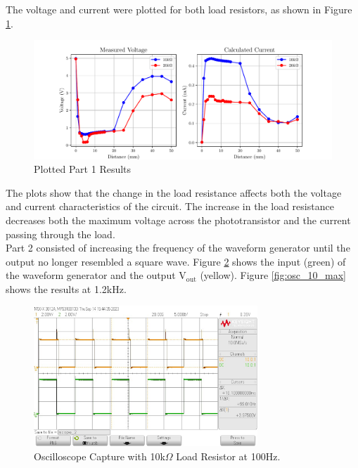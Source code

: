 \documentclass[CMPE]{KGCOEReport}
\begin{document}
The voltage and current were plotted for both load resistors, as shown in Figure \ref{fig:plots}.

\begin{figure}[H]
    \centering
    \includegraphics[width=1\textwidth]{results_plot.pdf}
    \caption{Plotted Part 1 Results}
    \label{fig:plots}
\end{figure}

The plots show that the change in the load resistance affects both the voltage and current characteristics of the circuit. The increase in the load resistance decreases both the maximum voltage across the phototransistor and the current passing through the load. \\

Part 2 consisted of increasing the frequency of the waveform generator until the output no longer resembled a square wave. Figure \ref{fig:osc_10_min} shows the input (green) of the waveform generator and the output V$_\text{out}$ (yellow). Figure \ref{fig:osc_10_max} shows the results at 1.2kHz.

\begin{figure}[H]
    \centering
    \includegraphics[width=0.75\textwidth]{output_min_10.png}
    \caption{Oscilloscope Capture with 10k$\Omega$ Load Resistor at 100Hz.}
    \label{fig:osc_10_min}
\end{figure}
\end{document}
